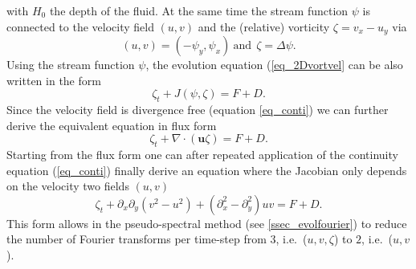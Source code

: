 with $H_{0}$ the depth of the fluid. At the same time
the stream function $\psi$ is connected to the velocity 
field $(u,v)$ and the (relative) 
vorticity $\zeta = v_{x} - u_{y}$ via
\begin{equation} \label{eq_psiuv}
  (u,v) = (- \psi_{y},\psi_{x}) \ \mbox{and} \ \ \zeta = \Delta \psi.
\end{equation}
Using the stream function $\psi$, the evolution equation (\ref{eq_2Dvortvel}
can be also written in the form
\begin{equation} \label{eq_2Dvortstream}
  \zeta_{t} + J(\psi,\zeta) = F + D.
\end{equation}
Since the velocity field is divergence free (equation \ref{eq_conti})
we can further derive the equivalent equation in flux form
\begin{equation} \label{eq_2Dflux}
  \zeta_{t} + \nabla \cdot \left(\mathbf{u} \zeta \right) = F + D.
\end{equation}
Starting from the flux form one can after repeated application of the
continuity equation (\ref{eq_conti}) finally derive an equation where
the Jacobian only depends on the velocity two fields $(u,v)$
\begin{equation} \label{eq_2Duv}
  \zeta_{t} 
   + \partial_{x} \partial_{y} \left( v^{2} - u^{2} \right) 
   + \left(\partial^{2}_{x} - \partial^{2}_{y} \right) uv
   = 
  F + D.
\end{equation}
This form allows in the pseudo-spectral method (see \ref{ssec_evolfourier}) 
to reduce the number of Fourier transforms per time-step from 
$3$, i.e.\ ($u,v,\zeta$) to $2$, i.e.\ ($u,v$).  

%
